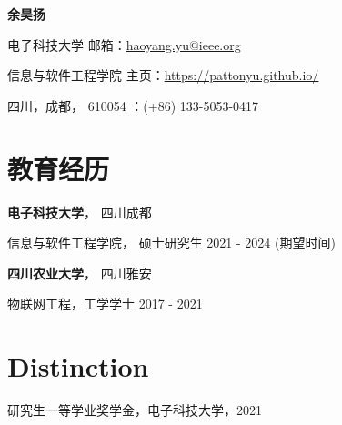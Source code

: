 \documentclass{article}
\begin{document}
\begin{center}
    \vspace*{5pt}
    \Huge{
    \textbf{余昊扬}}
\end{center}
\vspace{15pt}




\setlength{\parskip}{1pt}

\noindent 电子科技大学 \hfill 邮箱：\href{haoyang.yu@ieee.org}{haoyang.yu@ieee.org}

\noindent 信息与软件工程学院 \hfill 主页：\url{https://pattonyu.github.io/}

\noindent 四川，成都， 610054 ：(+86) 133-5053-0417

\setlength{\parskip}{3pt}






\section*{教育经历}
\indent 
\textbf{电子科技大学}， 四川成都

\hspace{2em}信息与软件工程学院， 硕士研究生 2021 - 2024 (期望时间)

\textbf{四川农业大学}， 四川雅安

\hspace{2em}物联网工程，工学学士 2017 - 2021









\section*{Distinction}
\indent
研究生一等学业奖学金，电子科技大学，2021
\end{document}
